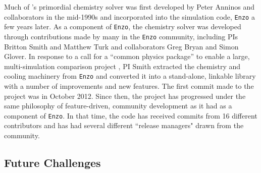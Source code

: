 Much of \grackle{}'s primordial chemistry solver was first developed
by Peter Anninos and collaborators in the mid-1990s
\citep{1997NewA....2..209A, 1997NewA....2..181A} and incorporated into
the simulation code, \texttt{Enzo} \citep[][licensed under the
  3-clause, revised BSD license]{2014ApJS..211...19B} a few
years later.  As a component of \texttt{Enzo}, the chemistry solver
was developed through contributions made by many in the
\texttt{Enzo} community, including PIs Britton Smith and Matthew Turk
and collaborators Greg Bryan and Simon Glover.  In response to a call for
a ``common physics package'' to enable a large, multi-simulation
comparison project \citep[AGORA,][]{2014ApJS..210...14K,
  2016ApJ...833..202K}, PI Smith extracted the chemistry and
cooling machinery from \texttt{Enzo} and converted it into a
stand-alone, linkable library with a number of improvements
and new features.  The first commit made to the \grackle{}
project was in October 2012.  Since then, the project has progressed
under the same philosophy of feature-driven, community development as
it had as a component of \texttt{Enzo}.  In that time, the code has
received commits from 16 different contributors and has had several different
``release managers" drawn from the community.

\subsection{Future Challenges}

